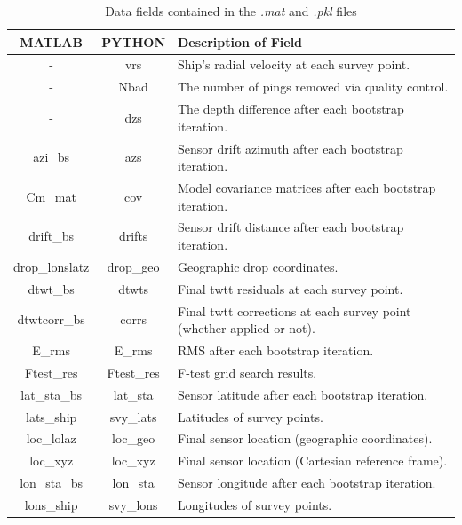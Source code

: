 \documentclass[titlepage, 12pt]{article}
\begin{document}
  \begin{table}[!htb]
   \centering
   \caption{Data fields contained in the \textit{.mat} and \textit{.pkl} files}
   \label{table:dict}
   \begin{tabularx}{\linewidth}{|c|c|X|}
    \hline
    \textbf{MATLAB} & \textbf{PYTHON} & \textbf{Description of Field} \\ \hline
    -               & vrs        & Ship's radial velocity at each survey point. \\ \hline
    -               & Nbad       & The number of pings removed via quality control. \\ \hline
    -               & dzs        & The depth difference after each bootstrap iteration. \\ \hline
    azi\_bs         & azs        & Sensor drift azimuth after each bootstrap iteration. \\ \hline
    Cm\_mat         & cov        & Model covariance matrices after each bootstrap iteration. \\ \hline
    drift\_bs       & drifts     & Sensor drift distance after each bootstrap iteration. \\ \hline
    drop\_lonslatz  & drop\_geo  & Geographic drop coordinates. \\ \hline
    dtwt\_bs        & dtwts      & Final twtt residuals at each survey point. \\ \hline
    dtwtcorr\_bs    & corrs      & Final twtt corrections at each survey point (whether applied or not). \\ \hline
    E\_rms          & E\_rms     & RMS after each bootstrap iteration. \\ \hline
    Ftest\_res      & Ftest\_res & F-test grid search results. \\ \hline
    lat\_sta\_bs    & lat\_sta   & Sensor latitude after each bootstrap iteration. \\ \hline
    lats\_ship      & svy\_lats  & Latitudes of survey points. \\ \hline
    loc\_lolaz      & loc\_geo   & Final sensor location (geographic coordinates). \\ \hline
    loc\_xyz        & loc\_xyz   & Final sensor location (Cartesian reference frame). \\ \hline
    lon\_sta\_bs    & lon\_sta   & Sensor longitude after each bootstrap iteration. \\ \hline
    lons\_ship      & svy\_lons  & Longitudes of survey points. \\ \hline

\end{tabularx}
\end{table}
\end{document}
